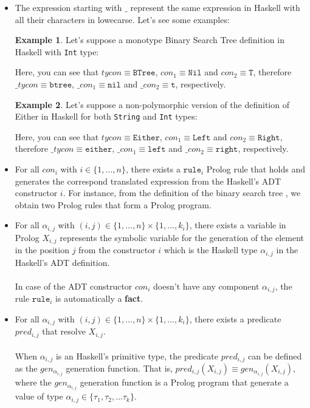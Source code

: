 \documentclass{report}
\theoremstyle{definition}
\newtheorem{example}{Example}[section]
\theoremstyle{definition}
\newcommand{\ttt}[1]{\texttt{#1}}
\begin{document}
\begin{itemize}
	\item The expression starting with $\_$ represent the same expression in Haskell with all their characters in lowecarse. Let's see some examples:
	      	      
		\begin{example}
			Let's suppose a monotype Binary Search Tree definition in Haskell with \ttt{Int} type:
			
			Here, you can see that $tycon \equiv \ttt{BTree}$, $con_1 \equiv \ttt{Nil}$ and $con_2 \equiv \ttt{T}$, therefore $\_tycon \equiv \ttt{btree}$, $\_con_1 \equiv \ttt{nil}$ and $\_con_2 \equiv \ttt{t}$, respectively.
		\end{example}
		\begin{example}
			Let's suppose a non-polymorphic version of the definition of Either in Haskell for both \ttt{String} and \ttt{Int} types:
			
			Here, you can see that $tycon \equiv \ttt{Either}$, $con_1 \equiv \ttt{Left}$ and $con_2 \equiv \ttt{Right}$, therefore $\_tycon \equiv \ttt{either}$, $\_con_1 \equiv \ttt{left}$ and $\_con_2 \equiv \ttt{right}$, respectively.
		\end{example}
	      
	\item For all $con_i$ with $i \in \{1, \ldots, n \}$, there exists a $\ttt{rule}_i$ Prolog rule that holds and generates the correspond translated expression from the Haskell's ADT constructor $i$. For instance, from the definition of the binary search tree , we obtain two Prolog rules that form a Prolog program.
	\item For all $\alpha_{i,j}$ with $(i,j) \in \{1, \ldots, n \} \times \{1, \ldots, k_i \}$, there exists a variable in Prolog $X_{i,j}$ represents the symbolic variable for the generation of the element in the position $j$ from the constructor $i$ which is the Haskell type $\alpha_{i,j}$ in the Haskell's ADT definition.\\\\
	In case of the ADT constructor $con_i$ doesn't have any component $\alpha_{i,j}$, the rule $\ttt{rule}_i$ is automatically a \textbf{fact}.

	\item For all $\alpha_{i,j}$ with $(i,j) \in \{1, \ldots, n \} \times \{1, \ldots, k_i \}$, there exists a predicate $pred_{i,j}$ that resolve $X_{i,j}$.\\\\
	When $\alpha_{i,j}$ is an Haskell's primitive type, the predicate $pred_{i,j}$ can be defined as the $gen_{\alpha_{i,j}}$ generation function. That is, $pred_{i,j}(X_{i,j}) \equiv gen_{\alpha_{i,j}}(X_{i,j})$, where the $gen_{\alpha_{i,j}}$ generation function is a Prolog program that generate a value of type $\alpha_{i,j} \in \{ \tau_1 , \tau_2, \ldots \tau_k \}$.

\end{itemize}
\end{document}
